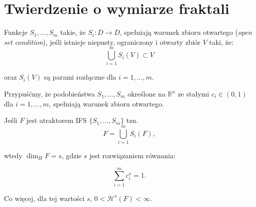 \documentclass{mini}
\begin{document}
\chapter{Twierdzenie o wymiarze fraktali}

\begin{df}\label{osc}
Funkcje $S_1,\ldots,S_m$ takie, że $S_i:D \longrightarrow D$, spełniają warunek zbioru otwartego (\textit{open set condition}), jeśli istnieje niepusty, ograniczony i otwarty zbiór $V$ taki, że:
$$
\bigcup^{m}_{i=1}S_i(V) \subset V
$$

oraz $S_i(V)$ są parami rozłączne dla $i=1,\ldots,m$. 
\end{df}

\begin{tw}\label{wym}
Przypuśćmy, że podobieństwa $S_1,\ldots,S_m$ określone na $\mathbb{R}^n$ ze stałymi $c_i \in (0,1)$ dla $i=1,\ldots,m$, spełniają warunek zbioru otwartego.

Jeśli $F$ jest atraktorem IFS $\lbrace S_1,\ldots,S_m\rbrace$ tzn. 
$$
F = \bigcup^{m}_{i=1}{S_i(F)},
$$

wtedy $\dim_HF=s$, gdzie $s$ jest rozwiązaniem równania:

\begin{equation}\label{s}
\sum^m_{i=1}c_i^s=1.
\end{equation}

Co więcej, dla tej wartości $s$, $0<\mathcal{H}^s(F)<\infty$.
\end{tw}
\end{document}
